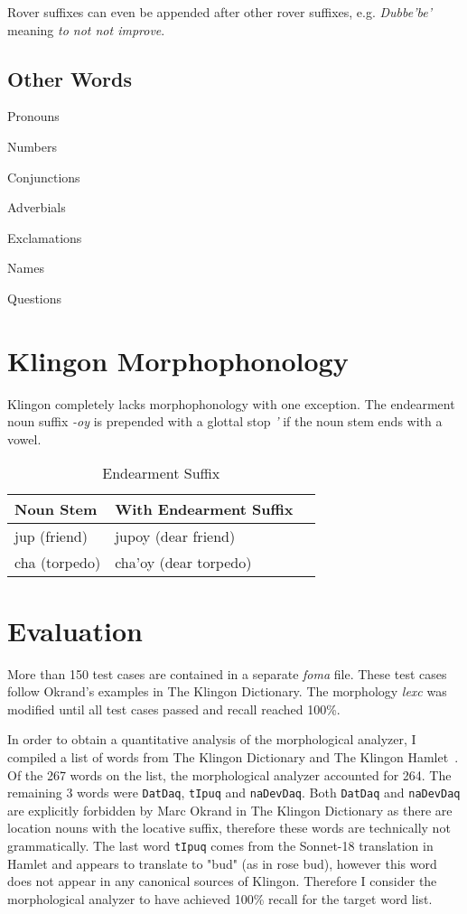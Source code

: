 \documentclass[11pt]{article}
\begin{document}
Rover suffixes can even be appended after other rover suffixes, e.g. \textit{Dubbe'be'} meaning \textit{to not not improve}.

\subsection {Other Words}

Pronouns

Numbers

Conjunctions

Adverbials

Exclamations

Names

Questions

\section{Klingon Morphophonology}

Klingon completely lacks morphophonology with one exception. The endearment noun suffix \textit{-oy} is prepended with a glottal stop \textit{'} if the noun stem ends with a vowel.

	\begin{table}[h]
	\begin{center}
	\begin{tabular}{lll}
	\toprule
	\bf Noun Stem & \bf With Endearment Suffix \\
	\midrule
	jup (friend) & jupoy (dear friend) \\
	cha (torpedo) & cha'oy (dear torpedo) \\
	\bottomrule
	\end{tabular}
	\end{center}
	\caption{Endearment Suffix}
	\end{table}

\section{Evaluation}

More than 150 test cases are contained in a separate \textit{foma} file. These test cases follow Okrand's examples in The Klingon Dictionary. The morphology \textit{lexc} was modified until all test cases passed and recall reached 100\%.

In order to obtain a quantitative analysis of the morphological analyzer, I compiled a list of words from The Klingon Dictionary and The Klingon Hamlet~\cite{0964434512}. Of the 267 words on the list, the morphological analyzer accounted for 264. The remaining 3 words were \texttt{DatDaq}, \texttt{tIpuq} and \texttt{naDevDaq}. Both \texttt{DatDaq} and \texttt{naDevDaq} are explicitly forbidden by Marc Okrand in The Klingon Dictionary as there are location nouns with the locative suffix, therefore these words are technically not grammatically. The last word \texttt{tIpuq} comes from the Sonnet-18 translation in Hamlet and appears to translate to "bud" (as in rose bud), however this word does not appear in any canonical sources of Klingon. Therefore I consider the morphological analyzer to have achieved 100\% recall for the target word list.



\end{document}
